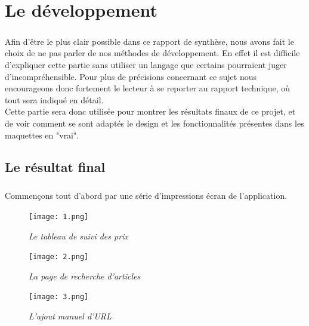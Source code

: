 \documentclass{report}
\begin{document}
\chapter{Le développement}

\paragraph{}
Afin d'être le plus clair possible dans ce rapport de synthèse, nous avons fait le choix de ne pas parler de nos méthodes de développement. En effet il est difficile d'expliquer cette partie sans utiliser un langage  que certains pourraient juger d'incompréhensible. Pour plus de précisions concernant ce sujet nous encourageons donc fortement le lecteur à se reporter au rapport technique, où tout sera indiqué en détail.\\
Cette partie sera donc utilisée pour montrer les résultats finaux de ce projet, et de voir comment se sont adaptés le design et les fonctionnalités présentes dans les maquettes en "vrai".


\section{Le résultat final}

\paragraph{}
Commençons tout d'abord par une série d'impressions écran de l'application.

\begin{figure}[H]
\begin{center}
\texttt{[image: 1.png]}
\caption{\textit{Le tableau de suivi des prix}}
\end{center}
\end{figure}

\begin{figure}[H]
\begin{center}
\texttt{[image: 2.png]}
\caption{\textit{La page de recherche d'articles}}
\end{center}
\end{figure}

\begin{figure}[H]
\begin{center}
\texttt{[image: 3.png]}
\caption{\textit{L'ajout manuel d'URL}}
\end{center}
\end{figure}
\end{document}
